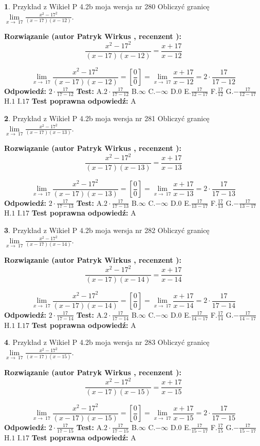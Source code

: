 \documentclass[12pt, a4paper]{article}
\theoremstyle{definition} %
\newtheorem{zad}{}
\newcommand{\zadStart}[1]{\begin{zad}#1\newline}
\newcommand{\zadStop}{\end{zad}}
\newcommand{\rozwStart}[2]{\noindent \textbf{Rozwiązanie (autor #1 , recenzent #2): }\newline}
\newcommand{\rozwStop}{\newline}
\newcommand{\odpStart}{\noindent \textbf{Odpowiedź:}\newline}
\newcommand{\odpStop}{\newline}
\newcommand{\testStart}{\noindent \textbf{Test:}\newline}
\newcommand{\testStop}{\newline}
\newcommand{\kluczStart}{\noindent \textbf{Test poprawna odpowiedź:}\newline}
\newcommand{\kluczStop}{\newline}
\begin{document}
\zadStart{Przykład z Wikieł P 4.2b moja wersja nr 280}
Obliczyć granicę $\lim\limits_{x\to\ 17}\frac{x^{2}-17^{2}}{(x-17)(x-12)}$.
\zadStop
\rozwStart{Patryk Wirkus}{}
$$\frac{x^{2}-17^{2}}{(x-17)(x-12)}=\frac{x+17}{x-12}$$

$$\lim\limits_{x\to\ 17}\frac{x^{2}-17^{2}}{(x-17)(x-12)}=[\frac{0}{0}]=\lim\limits_{x\to\ 17}\frac{x+17}{x-12}=2 \cdot \frac{17}{17-12}$$
\rozwStop
\odpStart
$2 \cdot \frac{17}{17-12}$
\odpStop
\testStart
A.$2 \cdot \frac{17}{17-12}$
B.$\infty$
C.$-\infty$
D.$0$
E.$\frac{17}{12-17}$
F.$\frac{17}{12}$
G.$-\frac{17}{12-17}$
H.$1$
I.$17$
\testStop
\kluczStart
A
\kluczStop



\zadStart{Przykład z Wikieł P 4.2b moja wersja nr 281}
Obliczyć granicę $\lim\limits_{x\to\ 17}\frac{x^{2}-17^{2}}{(x-17)(x-13)}$.
\zadStop
\rozwStart{Patryk Wirkus}{}
$$\frac{x^{2}-17^{2}}{(x-17)(x-13)}=\frac{x+17}{x-13}$$

$$\lim\limits_{x\to\ 17}\frac{x^{2}-17^{2}}{(x-17)(x-13)}=[\frac{0}{0}]=\lim\limits_{x\to\ 17}\frac{x+17}{x-13}=2 \cdot \frac{17}{17-13}$$
\rozwStop
\odpStart
$2 \cdot \frac{17}{17-13}$
\odpStop
\testStart
A.$2 \cdot \frac{17}{17-13}$
B.$\infty$
C.$-\infty$
D.$0$
E.$\frac{17}{13-17}$
F.$\frac{17}{13}$
G.$-\frac{17}{13-17}$
H.$1$
I.$17$
\testStop
\kluczStart
A
\kluczStop



\zadStart{Przykład z Wikieł P 4.2b moja wersja nr 282}
Obliczyć granicę $\lim\limits_{x\to\ 17}\frac{x^{2}-17^{2}}{(x-17)(x-14)}$.
\zadStop
\rozwStart{Patryk Wirkus}{}
$$\frac{x^{2}-17^{2}}{(x-17)(x-14)}=\frac{x+17}{x-14}$$

$$\lim\limits_{x\to\ 17}\frac{x^{2}-17^{2}}{(x-17)(x-14)}=[\frac{0}{0}]=\lim\limits_{x\to\ 17}\frac{x+17}{x-14}=2 \cdot \frac{17}{17-14}$$
\rozwStop
\odpStart
$2 \cdot \frac{17}{17-14}$
\odpStop
\testStart
A.$2 \cdot \frac{17}{17-14}$
B.$\infty$
C.$-\infty$
D.$0$
E.$\frac{17}{14-17}$
F.$\frac{17}{14}$
G.$-\frac{17}{14-17}$
H.$1$
I.$17$
\testStop
\kluczStart
A
\kluczStop



\zadStart{Przykład z Wikieł P 4.2b moja wersja nr 283}
Obliczyć granicę $\lim\limits_{x\to\ 17}\frac{x^{2}-17^{2}}{(x-17)(x-15)}$.
\zadStop
\rozwStart{Patryk Wirkus}{}
$$\frac{x^{2}-17^{2}}{(x-17)(x-15)}=\frac{x+17}{x-15}$$

$$\lim\limits_{x\to\ 17}\frac{x^{2}-17^{2}}{(x-17)(x-15)}=[\frac{0}{0}]=\lim\limits_{x\to\ 17}\frac{x+17}{x-15}=2 \cdot \frac{17}{17-15}$$
\rozwStop
\odpStart
$2 \cdot \frac{17}{17-15}$
\odpStop
\testStart
A.$2 \cdot \frac{17}{17-15}$
B.$\infty$
C.$-\infty$
D.$0$
E.$\frac{17}{15-17}$
F.$\frac{17}{15}$
G.$-\frac{17}{15-17}$
H.$1$
I.$17$
\testStop
\kluczStart
A
\kluczStop
\end{document}

